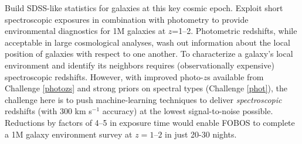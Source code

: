 \noindent{} Build SDSS-like statistics for galaxies at
this key cosmic epoch. Exploit short spectroscopic exposures in
combination with photometry to provide environmental diagnostics for
1M galaxies at $z$=1--2. Photometric redshifts, while acceptable in
large cosmological analyses, wash out information about the local
position of galaxies with respect to one another. To characterize a
galaxy's local environment and identify its neighbors requires
(observationally expensive) spectroscopic redshifts. However, with
improved photo-$z$s available from Challenge \ref{photozs} and strong
priors on spectral types (Challenge \ref{phot}), the challenge here
is to push machine-learning techniques to deliver
\emph{spectroscopic} redshifts (with 300 km s$^{-1}$ accuracy) at the
lowest signal-to-noise possible. Reductions by factors of 4--5 in
exposure time would enable FOBOS to complete a 1M galaxy environment
survey at $z=1$--$2$ in just 20-30 nights.

\noindent{}

\noindent{}

\noindent{}

